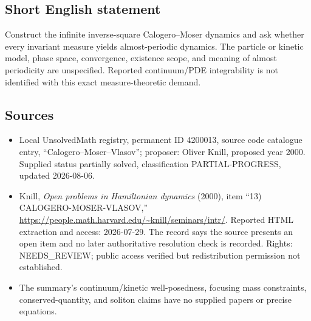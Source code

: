 \documentclass[11pt]{article}
\begin{document}
\subsection{Short English statement}
Construct the infinite inverse-square Calogero--Moser dynamics and ask whether every invariant measure yields almost-periodic dynamics. The particle or kinetic model, phase space, convergence, existence scope, and meaning of almost periodicity are unspecified. Reported continuum/PDE integrability is not identified with this exact measure-theoretic demand.
\subsection{Sources}
\begin{itemize}
\item Local UnsolvedMath registry, permanent ID 4200013, source code catalogue entry, ``Calogero--Moser--Vlasov''; proposer: Oliver Knill, proposed year 2000. Supplied status partially solved, classification PARTIAL-PROGRESS, updated 2026-08-06.
\item Knill, \emph{Open problems in Hamiltonian dynamics} (2000), item ``13) CALOGERO-MOSER-VLASOV,'' \url{https://people.math.harvard.edu/~knill/seminars/intr/}. Reported HTML extraction and access: 2026-07-29. The record says the source presents an open item and no later authoritative resolution check is recorded. Rights: NEEDS\_REVIEW; public access verified but redistribution permission not established.
\item The summary's continuum/kinetic well-posedness, focusing mass constraints, conserved-quantity, and soliton claims have no supplied papers or precise equations.
\end{itemize}
\end{document}
